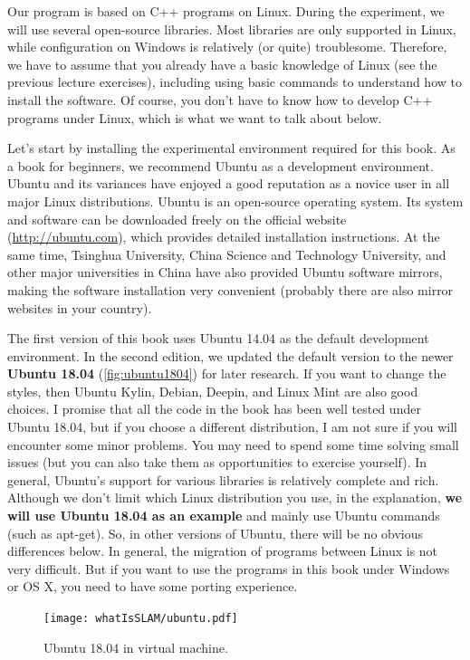 Our program is based on C++ programs on Linux. During the experiment, we will use several open-source libraries. Most libraries are only supported in Linux, while configuration on Windows is relatively (or quite) troublesome. Therefore, we have to assume that you already have a basic knowledge of Linux (see the previous lecture exercises), including using basic commands to understand how to install the software. Of course, you don't have to know how to develop C++ programs under Linux, which is what we want to talk about below.

Let's start by installing the experimental environment required for this book. As a book for beginners, we recommend Ubuntu as a development environment. Ubuntu and its variances have enjoyed a good reputation as a novice user in all major Linux distributions. Ubuntu is an open-source operating system. Its system and software can be downloaded freely on the official website (\url{http://ubuntu.com}), which provides detailed installation instructions. At the same time, Tsinghua University, China Science and Technology University, and other major universities in China have also provided Ubuntu software mirrors, making the software installation very convenient (probably there are also mirror websites in your country).

The first version of this book uses Ubuntu 14.04 as the default development environment. In the second edition, we updated the default version to the newer \textbf{Ubuntu 18.04} (\autoref{fig:ubuntu1804}) for later research. If you want to change the styles, then Ubuntu Kylin, Debian, Deepin, and Linux Mint are also good choices. I promise that all the code in the book has been well tested under Ubuntu 18.04, but if you choose a different distribution, I am not sure if you will encounter some minor problems. You may need to spend some time solving small issues (but you can also take them as opportunities to exercise yourself). In general, Ubuntu's support for various libraries is relatively complete and rich. Although we don't limit which Linux distribution you use, in the explanation, \textbf{we will use Ubuntu 18.04 as an example} and mainly use Ubuntu commands (such as apt-get). So, in other versions of Ubuntu, there will be no obvious differences below. In general, the migration of programs between Linux is not very difficult. But if you want to use the programs in this book under Windows or OS X, you need to have some porting experience.

\begin{figure}[!ht]
    \centering
    \texttt{[image: whatIsSLAM/ubuntu.pdf]}
    \caption{Ubuntu 18.04 in virtual machine.}
    \label{fig:ubuntu1804}
\end{figure}

